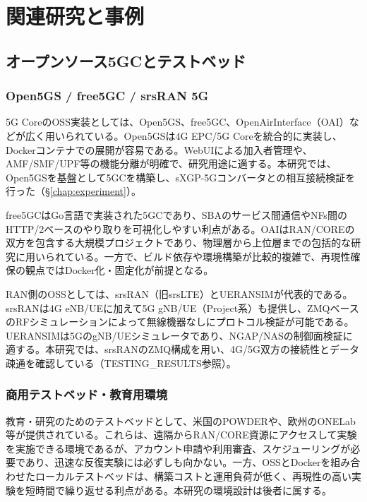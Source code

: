 \chapter{関連研究と事例}
\label{chap:related}

\section{オープンソース5GCとテストベッド}

\subsection{Open5GS / free5GC / srsRAN 5G}

5G CoreのOSS実装としては、Open5GS、free5GC、OpenAirInterface（OAI）などが広く用いられている。Open5GSは4G EPC/5G Coreを統合的に実装し、Dockerコンテナでの展開が容易である。WebUIによる加入者管理や、AMF/SMF/UPF等の機能分離が明確で、研究用途に適する。本研究では、Open5GSを基盤として5GCを構築し、sXGP-5Gコンバータとの相互接続検証を行った（\S\ref{chap:experiment}）。

free5GCはGo言語で実装された5GCであり、SBAのサービス間通信やNFs間のHTTP/2ベースのやり取りを可視化しやすい利点がある。OAIはRAN/COREの双方を包含する大規模プロジェクトであり、物理層から上位層までの包括的な研究に用いられている。一方で、ビルド依存や環境構築が比較的複雑で、再現性確保の観点ではDocker化・固定化が前提となる。

RAN側のOSSとしては、srsRAN（旧srsLTE）とUERANSIMが代表的である。srsRANは4G eNB/UEに加えて5G gNB/UE（Project系）も提供し、ZMQベースのRFシミュレーションによって無線機器なしにプロトコル検証が可能である。UERANSIMは5GのgNB/UEシミュレータであり、NGAP/NASの制御面検証に適する。本研究では、srsRANのZMQ構成を用い、4G/5G双方の接続性とデータ疎通を確認している（TESTING\_RESULTS参照）。

\subsection{商用テストベッド・教育用環境}

教育・研究のためのテストベッドとして、米国のPOWDERや、欧州のONELab等が提供されている。これらは、遠隔からRAN/CORE資源にアクセスして実験を実施できる環境であるが、アカウント申請や利用審査、スケジューリングが必要であり、迅速な反復実験には必ずしも向かない。一方、OSSとDockerを組み合わせたローカルテストベッドは、構築コストと運用負荷が低く、再現性の高い実験を短時間で繰り返せる利点がある。本研究の環境設計は後者に属する。

